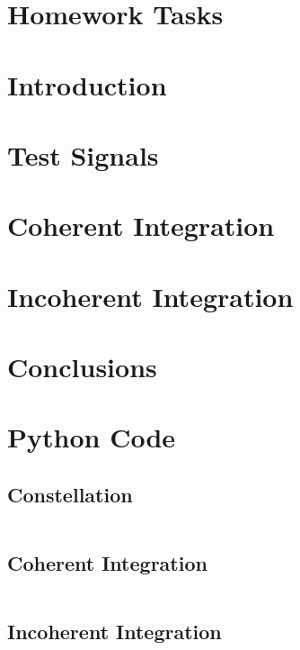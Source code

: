 \documentclass[10pt, a4paper]{article}
\begin{document}


\section*{Homework Tasks}

\pagebreak

\section{Introduction}


\section{Test Signals}


\section{Coherent Integration}


\section{Incoherent Integration}


\section{Conclusions}



\printbibheading
\begin{refsection}
\nocite{*}
\printbibliography[heading=subbibliography,title={Literature}]
\end{refsection}

\begin{refsection}
\nocite{*}
\printbibliography[heading=subbibliography,title={Software Used}]
\end{refsection}

\pagebreak
\appendix
\section{Python Code}\label{app:script}

\subsection{Constellation}\label{app:constellation}
\inputminted{python}{./code/constellation.py}

\subsection{Coherent Integration}\label{app:ci}
\inputminted{python}{./code/coherent_integration.py}

\subsection{Incoherent Integration}\label{app:nci}
\inputminted{python}{./code/incoherent_integration.py}
\end{document}
